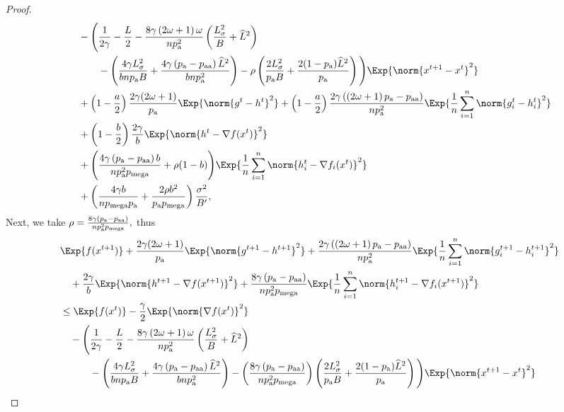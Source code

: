 \documentclass{article}
\newcommand*{\probavailable}{\ensuremath{p_{\textnormal{a}}}}
\newcommand*{\probpairaa}{\ensuremath{p_{\textnormal{aa}}}}
\newcommand*{\probmega}{\ensuremath{p_{\text{mega}}}}
\begin{document}
\begin{proof}
\begin{align*}
    &\quad - \Bigg(\frac{1}{2\gamma} - \frac{L}{2} - \frac{8 \gamma \left(2 \omega + 1\right)\omega}{n \probavailable^2}\left(\frac{L_{\sigma}^2}{B} + \widehat{L}^2\right) \\
    &\qquad\quad - \left(\frac{4 \gamma L_{\sigma}^2}{b n \probavailable B} + \frac{4 \gamma\left(\probavailable - \probpairaa\right) \widehat{L}^2}{b n \probavailable^2}\right) - \rho \left(\frac{2 L_{\sigma}^2}{\probavailable B} + \frac{2(1 - \probavailable) \widehat{L}^2}{\probavailable}\right)\Bigg) \Exp{\norm{x^{t+1} - x^t}^2} \\
    &\quad + \left(1 - \frac{a}{2}\right)\frac{2\gamma(2\omega + 1)}{\probavailable} \Exp{\norm{g^{t} - h^{t}}^2} + \left(1 - \frac{a}{2}\right)\frac{2\gamma\left(\left(2 \omega + 1\right)\probavailable - \probpairaa\right)}{n \probavailable^2}\Exp{\frac{1}{n}\sum_{i=1}^n\norm{g^{t}_i - h^{t}_i}^2} \\
    &\quad + \left(1 - \frac{b}{2}\right)\frac{2\gamma}{b} \Exp{\norm{h^{t} - \nabla f(x^{t})}^2} \\
    &\quad + \Bigg(\frac{4 \gamma \left(\probavailable - \probpairaa\right) b}{n \probavailable^2 \probmega} + \rho (1 - b)\Bigg)\Exp{\frac{1}{n}\sum_{i=1}^n\norm{h^{t}_i - \nabla f_i(x^{t})}^2} \\
    &\quad + \left(\frac{4 \gamma b}{n \probmega \probavailable} + \frac{2 \rho b^2}{\probavailable \probmega}\right) \frac{\sigma^2}{B'},
  \end{align*}
  Next, we take $\rho = \frac{8 \gamma \left(\probavailable - \probpairaa\right)}{n \probavailable^2 \probmega},$ thus
  \begin{align*}
    &\Exp{f(x^{t + 1})} + \frac{2\gamma(2\omega + 1)}{\probavailable} \Exp{\norm{g^{t+1} - h^{t+1}}^2} + \frac{2\gamma\left(\left(2 \omega + 1\right)\probavailable - \probpairaa\right)}{n \probavailable^2} \Exp{\frac{1}{n}\sum_{i=1}^n\norm{g^{t+1}_i - h^{t+1}_i}^2}\\
    &\quad  + \frac{2\gamma}{b} \Exp{\norm{h^{t+1} - \nabla f(x^{t+1})}^2} + \frac{8 \gamma \left(\probavailable - \probpairaa\right)}{n \probavailable^2 \probmega} \Exp{\frac{1}{n}\sum_{i=1}^n\norm{h^{t+1}_i - \nabla f_i(x^{t+1})}^2}\\
    &\leq \Exp{f(x^t)} - \frac{\gamma}{2}\Exp{\norm{\nabla f(x^t)}^2} \\
    &\quad - \Bigg(\frac{1}{2\gamma} - \frac{L}{2} - \frac{8 \gamma \left(2 \omega + 1\right)\omega}{n \probavailable^2}\left(\frac{L_{\sigma}^2}{B} + \widehat{L}^2\right) \\
    &\qquad\quad - \left(\frac{4 \gamma L_{\sigma}^2}{b n \probavailable B} + \frac{4 \gamma\left(\probavailable - \probpairaa\right) \widehat{L}^2}{b n \probavailable^2}\right) - \left(\frac{8 \gamma \left(\probavailable - \probpairaa\right)}{n \probavailable^2 \probmega}\right) \left(\frac{2 L_{\sigma}^2}{\probavailable B} + \frac{2(1 - \probavailable) \widehat{L}^2}{\probavailable}\right)\Bigg) \Exp{\norm{x^{t+1} - x^t}^2} \\

\end{align*}
\end{proof}
\end{document}

